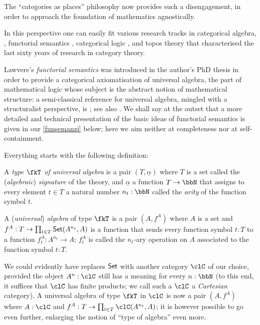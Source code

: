 The ``categories as places'' philosophy now provides such a disengagement, in order to approach the foundation of mathematics agnostically.%

In this perspective one can easily fit various research tracks in categorical algebra, \cite{Janelidze2004}, functorial semantics \cite{lawvere1963functorial,hyland2007category}, categorical logic \cite{lambek1988introduction}, and topos theory \cite{JohnstonePT} that characterised the last sixty years of research in category theory.

Lawvere's \emph{functorial semantics} was introduced in the author's PhD thesis \cite{lawvere1963functorial} in order to provide a categorical axiomatisation of universal algebra, the part of mathematical logic whose subject is the abstract notion of mathematical structure: a semi-classical reference for universal algebra, mingled with a structuralist perspective, is \cite{manes2012algebraic}; see also \cite{sankappanavar}. We shall say at the outset that a more detailed and technical presentation of the basic ideas of functorial semantics is given in our \autoref{funsemanzi} below; here we aim neither at completeness nor at self-containment.

Everything starts with the following definition:
\begin{definition}\label{unialg}
	A \emph{type $\fkT$ of universal algebra} is a pair $(T,\underline{\alpha})$ where $T$ is a set called the (\emph{algebraic}) \emph{signature} of the theory, and $\underline\alpha$ a function $T \to \bbN$ that assigns to every element $t\in T$ a natural number $n_t: \bbN$ called the \emph{arity} of the function symbol $t$.
\end{definition}
\begin{definition}
	A (\emph{universal}) \emph{algebra} of type $\fkT$ is a pair $(A,f^A)$ where $A$ is a set and $f^A: T \to \prod_{t\in T} \mathsf{Set}(A^{n_t},A )$ is a function that sends every function symbol $t: T$ to a function $f^A_t: A^{n_t} \to A$; $f^A_t$ is called the $n_t$-ary operation on $A$ associated to the function symbol $t: T$.
\end{definition}
We could evidently have replaces $\mathsf{Set}$ with another category $\clC$ of our choice, provided the object $A^n: \clC$ still has a meaning for every $n: \bbN$ (to this end, it suffices that $\clC$ has finite products; we call such a $\clC$ a \emph{Cartesian} category). A universal algebra of type $\fkT$ in $\clC$ is now a pair $(A,f^A)$ where $A: \clC$ and $f^A: T \to \prod_{t\in T} \clC(A^{n_t},A )$; it is however possible to go even further, enlarging the notion of ``type of algebra'' even more.

